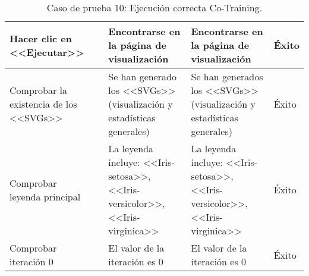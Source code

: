 \begin{table}[H]
\begin{tabular}{p{}p{}p{}p{}p{}}
Hacer clic en <<Ejecutar>>                            &                        & Encontrarse en la página de visualización                            & Encontrarse en la página de visualización                    & Éxito                            \\ \hline
Comprobar la existencia de los <<SVGs>>               &                        & Se han generado los <<SVGs>> (visualización y estadísticas generales) & Se han generados los <<SVGs>> (visualización y estadísticas generales)& Éxito  \\ \hline 
Comprobar leyenda principal                           &                        & La leyenda incluye: <<Iris-setosa>>, <<Iris-versicolor>>, <<Iris-virginica>> & La leyenda incluye: <<Iris-setosa>>, <<Iris-versicolor>>, <<Iris-virginica>> & Éxito \\ \hline
Comprobar iteración 0                                 &                        & El valor de la iteración es 0                                        & El valor de la iteración es 0                                & Éxito \\ \hline
\end{tabular}
\caption{Caso de prueba 10: Ejecución correcta Co-Training.}
\end{table}


